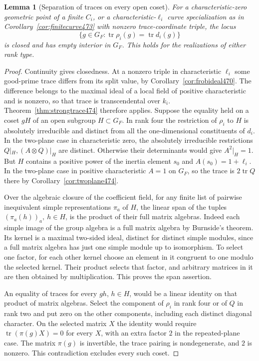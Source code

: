 \documentclass[a4paper,11pt]{article}
\newtheorem{lemma}[proposition]{Lemma}
\theoremstyle{definition}
\theoremstyle{remark}
\numberwithin{equation}{section}
\begin{document}
\begin{lemma}[Separation of traces on every open coset]\leavevmode
\label{lem:opencoset475}
For a characteristic-zero geometric point of a finite \(C_i\), or
a characteristic-\(\ell_i\) curve specialization as in
Corollary~\ref{cor:finitecurve473} with nonzero trace-coordinate
triple, the locus
\[
        \{g\in G_F:\operatorname{tr}\rho_i(g)=
                                     \operatorname{tr}d_i(g)\}
\]
is closed and has empty interior in \(G_F\). This holds for the
realizations of either rank type.
\end{lemma}
\begin{proof}
Continuity gives closedness. At a nonzero triple in characteristic
\(\ell_i\) some good-prime trace differs from its split value,
by Corollary~\ref{cor:frobideal470}. The difference belongs to
the maximal ideal of a local field of positive characteristic
and is nonzero, so that trace is transcendental over \(k_i\).
Theorem~\ref{thm:strongtrace474} therefore applies. Suppose the
equality held on a coset \(gH\) of an open subgroup \(H\subset G_F\).
In rank four the restriction of \(\rho_i\) to \(H\) is absolutely
irreducible and distinct from all the one-dimensional constituents
of \(d_i\). In the two-plane case in characteristic zero, the
absolutely irreducible restrictions \(Q|_H,(A\otimes Q)|_H\)
are distinct. Otherwise their determinants would give \(A^2|_H=1\).
But \(H\) contains a positive power of the inertia element \(s_0\)
and \(A(s_0)=1+\ell_i\). In the two-plane case in positive
characteristic \(A=1\) on \(G_F\), so the trace is
\(2\operatorname{tr}Q\) there by Corollary~\ref{cor:twoplane474}.

Over the algebraic closure of the coefficient field, for any
finite list of pairwise inequivalent simple representations
\(\pi_a\) of \(H\), the linear span of the tuples
\((\pi_a(h))_a,\ h\in H\), is the product of their full matrix
algebras. Indeed each simple image of the group algebra is a
full matrix algebra by Burnside's theorem. Its kernel is a
maximal two-sided ideal, distinct for distinct simple modules,
since a full matrix algebra has just one simple module up to
isomorphism. To select one factor, for each other kernel choose
an element in it congruent to one modulo the selected kernel.
Their product selects that factor, and arbitrary matrices in it
are then obtained by multiplication. This proves the span assertion.

An equality of traces for every \(gh\), \(h\in H\), would be
a linear identity on that product of matrix algebras. Select
the component of \(\rho_i\) in rank four or of \(Q\) in rank two
and put zero on the other components, including each distinct
diagonal character. On the selected matrix \(X\) the identity
would require \(\operatorname{tr}(\pi(g)X)=0\) for every \(X\),
with an extra factor \(2\) in the repeated-plane case. The
matrix \(\pi(g)\) is invertible, the trace pairing is nondegenerate,
and \(2\) is nonzero. This contradiction excludes every such coset.
\end{proof}
\end{document}
